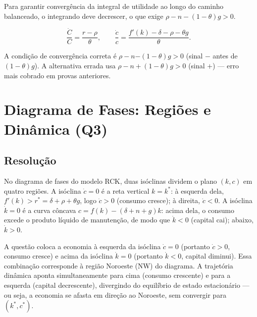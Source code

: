 \documentclass[12pt, a4paper]{article}
\begin{document}
Para garantir convergência da integral de utilidade ao longo do caminho balanceado, o integrando deve decrescer, o que exige $\rho - n - (1-\theta)g > 0$.

\begin{formulabox}[title={Equação de Euler e Regra de Keynes-Ramsey (Q2)}]
\[
\boxed{\frac{\dot{C}}{C} = \frac{r-\rho}{\theta},} \qquad \frac{\dot{c}}{c} = \frac{f'(k)-\delta-\rho-\theta g}{\theta}.
\]
\end{formulabox}

\begin{provabox}[title={Q2 --- O Sinal que Todo Mundo Erra}]
A condição de convergência correta é $\rho - n \mathbf{-} (1-\theta)g > 0$ (sinal $\mathbf{-}$ antes de $(1-\theta)g$). A alternativa errada usa $\rho - n + (1-\theta)g > 0$ (sinal $+$) --- erro mais cobrado em provas anteriores.
\end{provabox}

\section{Diagrama de Fases: Regiões e Dinâmica (Q3)}

\subsection*{Resolução}

No diagrama de fases do modelo RCK, duas isóclinas dividem o plano $(k,c)$ em quatro regiões. A isóclina $\dot{c}=0$ é a reta vertical $k = k^*$: à esquerda dela, $f'(k) > r^* = \delta+\rho+\theta g$, logo $\dot{c} > 0$ (consumo cresce); à direita, $\dot{c} < 0$. A isóclina $\dot{k}=0$ é a curva côncava $c = f(k)-(\delta+n+g)k$: acima dela, o consumo excede o produto líquido de manutenção, de modo que $\dot{k} < 0$ (capital cai); abaixo, $\dot{k} > 0$.

A questão coloca a economia à esquerda da isóclina $\dot{c}=0$ (portanto $\dot{c}>0$, consumo cresce) e acima da isóclina $\dot{k}=0$ (portanto $\dot{k}<0$, capital diminui). Essa combinação corresponde à região Noroeste (NW) do diagrama. A trajetória dinâmica aponta simultaneamente para cima (consumo crescente) e para a esquerda (capital decrescente), divergindo do equilíbrio de estado estacionário --- ou seja, a economia se afasta em direção ao Noroeste, sem convergir para $(k^*, c^*)$.
\end{document}
